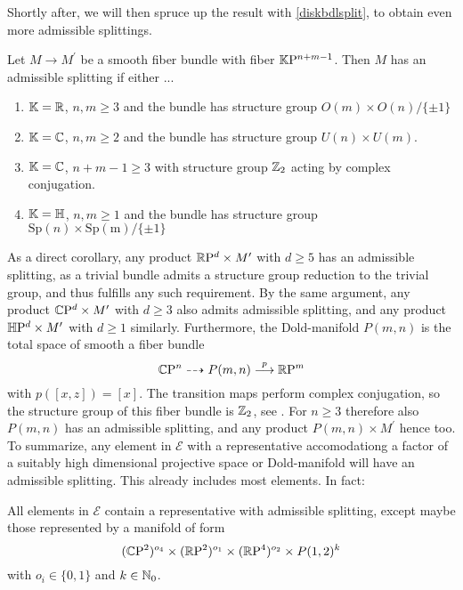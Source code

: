 Shortly after, we will then spruce up the result with \ref{diskbdlsplit}, to obtain even more admissible splittings.
\begin{thesislemma}
    Let $M \to M^\prime$ be a smooth fiber bundle with fiber $\mathbb{K}\mathrm{P}^{n + m - 1}$. Then $M$ has an admissible splitting if either ...
    \begin{enumerate}[label=$\dots$, noitemsep]
        \item $\mathbb{K} = \mathbb{R}$, $n,m\geq 3$ and the bundle has structure group $O(m)\times O(n) / \{\pm 1\}$
        \item $\mathbb{K} = \mathbb{C}$, $n,m \geq 2$ and the bundle has structure group $U(n)\times U(m)$.
        \item $\mathbb{K} = \mathbb{C}$, $n + m -1 \geq 3$ with structure group $\mathbb{Z}_2$ acting by complex conjugation.
        \item $\mathbb{K} = \mathbb{H}$, $n,m\geq 1$ and the bundle has structure group $\mathrm{Sp}(n)\times\mathrm{Sp(m)}/\{\pm 1\}$
    \end{enumerate}
\end{thesislemma}
As a direct corollary, any product $\mathbb{R}\mathrm{P}^d\times M^\prime$ with $d \geq 5$ has an admissible splitting, as a trivial bundle admits a structure group reduction to the trivial group, and thus fulfills any such requirement.
By the same argument, any product $\mathbb{C}\mathrm{P}^d\times M^\prime$ with $d\geq 3$ also admits admissible splitting, and any product $\mathbb{H}\mathrm{P}^d \times M^\prime$ with $d\geq 1$ similarly. 
Furthermore, the Dold-manifold $P(m,n)$ is the total space of smooth a fiber bundle 
\begin{equation*}
    \mathbb{C}\mathrm{P}^n \dashrightarrow P(m,n) \overset{p}{\longrightarrow} \mathbb{R}\mathrm{P}^m
\end{equation*}
with $p([x,z]) = [x]$. 
The transition maps perform complex conjugation, so the structure group of this fiber bundle is $\mathbb{Z}_2$, see \cite{dold:bord}.
For $n\geq 3$ therefore also $P(m,n)$ has an admissible splitting, and any product $P(m,n)\times M^\prime$ hence too.
To summarize,
any element in $\mathcal{E}$ with a representative accomodationg a factor of a suitably high dimensional projective space or Dold-manifold will have an admissible splitting.
This already includes most elements. In fact:
\begin{thesisprop}\label{fbo}
    All elements in $\mathcal{E}$ contain a representative with admissible splitting, except maybe those represented by a manifold of form
    \begin{equation*}
        (\mathbb{C}\mathrm{P}^2)^{o_4} \times (\mathbb{R}\mathrm{P}^2)^{o_1} \times (\mathbb{R}\mathrm{P}^4)^{o_2} \times P(1,2)^k
    \end{equation*}
    with $o_i \in \{0,1\}$ and $k\in \mathbb{N}_0$.
\end{thesisprop}
